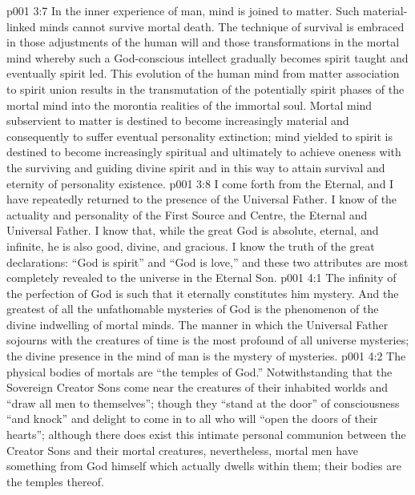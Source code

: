 \vs p001 3:7 \pc In the inner experience of man, mind is joined to matter. Such material\hyp{}linked minds cannot survive mortal death. The technique of survival is embraced in those adjustments of the human will and those transformations in the mortal mind whereby such a God\hyp{}conscious intellect gradually becomes spirit taught and eventually spirit led. This evolution of the human mind from matter association to spirit union results in the transmutation of the potentially spirit phases of the mortal mind into the morontia realities of the immortal soul. Mortal mind subservient to matter is destined to become increasingly material and consequently to suffer eventual personality extinction; mind yielded to spirit is destined to become increasingly spiritual and ultimately to achieve oneness with the surviving and guiding divine spirit and in this way to attain survival and eternity of personality existence.
\vs p001 3:8 I come forth from the Eternal, and I have repeatedly returned to the presence of the Universal Father. I know of the actuality and personality of the First Source and Centre, the Eternal and Universal Father. I know that, while the great God is absolute, eternal, and infinite, he is also good, divine, and gracious. I know the truth of the great declarations: “God is spirit” and “God is love,” and these two attributes are most completely revealed to the universe in the Eternal Son.
\vs p001 4:1 The infinity of the perfection of God is such that it eternally constitutes him mystery. And the greatest of all the unfathomable mysteries of God is the phenomenon of the divine indwelling of mortal minds. The manner in which the Universal Father sojourns with the creatures of time is the most profound of all universe mysteries; the divine presence in the mind of man is the mystery of mysteries.
\vs p001 4:2 The physical bodies of mortals are “the temples of God.” Notwithstanding that the Sovereign Creator Sons come near the creatures of their inhabited worlds and “draw all men to themselves”; though they “stand at the door” of consciousness “and knock” and delight to come in to all who will “open the doors of their hearts”; although there does exist this intimate personal communion between the Creator Sons and their mortal creatures, nevertheless, mortal men have something from God himself which actually dwells within them; their bodies are the temples thereof.
